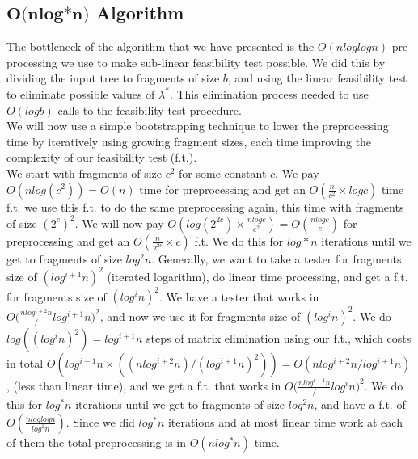 \documentclass[11pt,a4paper]{article}
\theoremstyle{definition}
\theoremstyle{remark}
\begin{document}
\subsection{$\textbf{O(nlog*n)}$ Algorithm}
The bottleneck of the algorithm that we have presented is the $O(nloglogn)$ pre-processing we use to make sub-linear feasibility test possible. We did this by dividing the input tree to fragments of size $b$, and using the linear feasibility test to eliminate possible values of $\lambda^*$. This elimination process needed to use $O(logb)$ calls to the feasibility test procedure.
\\We will now use a simple bootstrapping technique to lower the preprocessing time by iteratively using growing fragment sizes, each time improving the complexity of our feasibility test (f.t.).\\
We start with fragments of size $c^2$ for some constant $c$.
We pay $O(nlog(c^2)) = O(n)$ time for preprocessing and get an $O(\frac{n}{c^2} \times logc)$ time f.t.
we use this f.t. to do the same preprocessing again, this time with fragments of size $(2^c)^2$.
We will now pay $O(log(2^{2c}) \times \frac{nlogc}{c^2})= O(\frac{nlogc}{c})$ for preprocessing and get an $O(\frac{n}{2^{2c}} \times c)$ f.t.
We do this for $log*n$ iterations until we get to fragments of size $log^2n$.
Generally, we want to take a tester for fragments size of $(log^{i+1}n)^2$ (iterated logarithm), do linear time processing, and get a f.t. for fragments size of $(log^in)^2$. We have a tester that works in $O(\frac{nlog^{i+2}n}/{log^{i+1}n)^2}$, and now we use it for fragments size of $(log^in)^2$. We do $log((log^in)^2) = log^{i+1}n$   steps of matrix elimination using our f.t., which costs in total $O(log^{i+1}n \times ((nlog^{i+2}n)/(log^{i+1}n)^2)) = O(nlog^{i+2}n/log^{i+1}n)$, (less than linear time), and we get a f.t. that works in $O(\frac{nlog^{i+1}n}/{log^in)^2}$.
We do this for $log^*n$ iterations until we get to fragments of size $log^2n$, and have a f.t. of $O(\frac{nloglogn}{log^2n})$. Since we did $log^*n$ iterations and at most linear time work at each of them the total preprocessing is in $O(nlog^*n)$ time.





\end{document}
